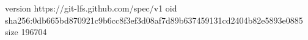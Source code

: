 version https://git-lfs.github.com/spec/v1
oid sha256:0db665bd870921c9b6cc8f3ef3d08af7d89b637459131cd2404b82e5893e0885
size 196704

